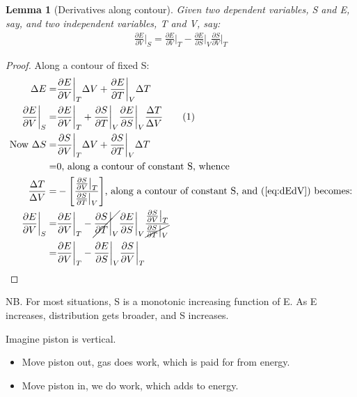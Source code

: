 \documentclass[]{article}
\newcommand\numberthis{\addtocounter{equation}{1}\tag{\theequation}}
\newtheorem{lemma}[thm]{Lemma}
\begin{document}
\begin{lemma}[Derivatives along contour]\label{thm:derivative:contour}
	Given two dependent variables, S and E, say, and two independent variables, T and V, say:
	\begin{align*}
		\frac{\partial E}{\partial V}\bigg|_S = \frac{\partial E}{\partial V}\bigg|_T - 	\frac{\partial E}{\partial S}\bigg|_V \frac{\partial S}{\partial V}\bigg|_T
	\end{align*}
\end{lemma}
\begin{proof}
	Along a contour of fixed S:
	\begin{align*}
		\Delta E =& \frac{\partial E}{\partial V} \bigg|_T \Delta V + \frac{\partial E}{\partial T} \bigg|_V \Delta T\\
		\frac{\partial E}{\partial V} \bigg|_S=& \frac{\partial E}{\partial V} \bigg|_T  + \frac{\partial S}{\partial T} \bigg|_V \frac{\partial E}{\partial S} \bigg|_V \frac{\Delta T}{\Delta V} \numberthis\label{eq:dEdV}\\
		\text{Now }\Delta S =& \frac{\partial S}{\partial V} \bigg|_T \Delta V + \frac{\partial S}{\partial T} \bigg|_V \Delta T\\
		=& 0\text{, along a contour of constant S, whence}\\
		\frac{\Delta T}{\Delta V} =& - \Bigg[\frac{\frac{\partial S}{\partial V}\big|_T}{\frac{\partial S}{\partial T}\big|_V}\Bigg]\text{, along a contour of constant S, and (\ref{eq:dEdV}) becomes:}\\
		\frac{\partial E}{\partial V} \bigg|_S=& \frac{\partial E}{\partial V} \bigg|_T  - \cancel{\frac{\partial S}{\partial T} \bigg|_V} \frac{\partial E}{\partial S} \bigg|_V \frac{\frac{\partial S}{\partial V}\big|_T}{\cancel{\frac{\partial S}{\partial T}\big|_V}}\\
		=& \frac{\partial E}{\partial V} \bigg|_T  -  \frac{\partial E}{\partial S} \bigg|_V \frac{\partial S}{\partial V}\bigg|_T
	\end{align*}
\end{proof}

NB. For most situations, S is a monotonic increasing function of E. As E increases, distribution gets broader, and S increases. 

Imagine piston is vertical.
\begin{itemize}
	\item Move piston out, gas does work, which is paid for from energy.
	\item Move piston in, we do work, which adds to energy.
\end{itemize}
\end{document}
